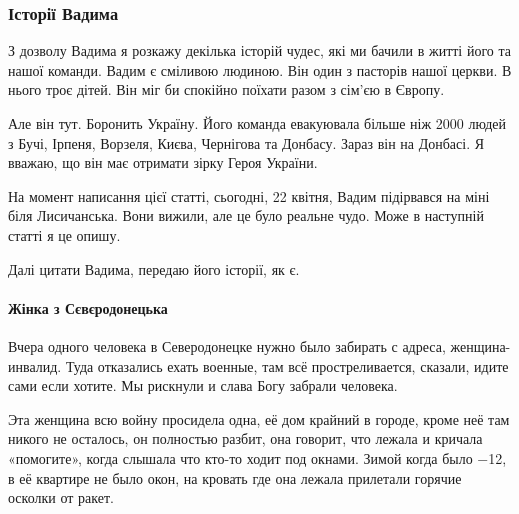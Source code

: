  
 
 
 
 

\subsubsection{Історії Вадима}

З дозволу Вадима я розкажу декілька історій чудес, які ми бачили в житті його
та нашої команди. Вадим є сміливою людиною. Він один з пасторів нашої церкви. В
нього троє дітей. Він міг би спокійно поїхати разом з сім'єю в Європу.

Але він тут. Боронить Україну. Його команда евакуювала більше ніж 2000 людей з
Бучі, Ірпеня, Ворзеля, Києва, Чернігова та Донбасу. Зараз він на Донбасі. Я
вважаю, що він має отримати зірку Героя України.


На момент написання цієї статті, сьогодні, 22 квітня, Вадим підірвався на міні
біля Лисичанська. Вони вижили, але це було реальне чудо. Може в наступній
статті я це опишу.

Далі цитати Вадима, передаю його історії, як є.

\paragraph{Жінка з Сєвєродонецька}

Вчера одного человека в Северодонецке нужно было забирать с адреса,
женщина-инвалид. Туда отказались ехать военные, там всё простреливается,
сказали, идите сами если хотите. Мы рискнули и слава Богу забрали человека.

Эта женщина всю войну просидела одна, её дом крайний в городе, кроме неё там
никого не осталось, он полностью разбит, она говорит, что лежала и кричала
«помогите», когда слышала что кто-то ходит под окнами. Зимой когда было −12, в
её квартире не было окон, на кровать где она лежала прилетали горячие осколки
от ракет.


